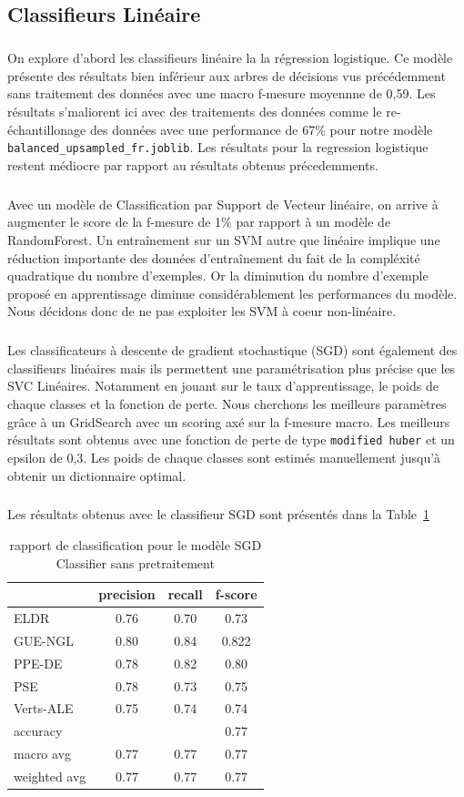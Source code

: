 \documentclass[11pt]{article}
\begin{document}
\subsection{Classifieurs Linéaire}
\subparagraph{}
On explore d'abord les classifieurs linéaire la la régression logistique. Ce modèle présente des résultats bien inférieur aux arbres de décisions vus précédemment sans traitement des données avec une macro f-mesure moyennne de 0,59. Les résultats s'maliorent ici avec des traitements des données comme le re-échantillonage des données avec une performance de 67\% pour notre modèle  \texttt{balanced\_upsampled\_fr.joblib}. Les résultats pour la regression logistique restent médiocre par rapport au résultats obtenus précedemments.
\subparagraph{}
Avec un modèle de Classification par Support de Vecteur linéaire, on arrive à augmenter le score de la f-mesure de 1\% par rapport à un modèle de RandomForest. Un entraînement sur un SVM autre que linéaire implique une réduction importante des données d'entraînement du fait de la compléxité quadratique du nombre d'exemples. Or la diminution du nombre d'exemple proposé en apprentissage diminue considérablement les performances du modèle. Nous décidons donc de ne pas exploiter les SVM à coeur non-linéaire.
\subparagraph{}
Les classificateurs à descente de gradient stochastique (SGD) sont également des classifieurs linéaires mais ils permettent une paramétrisation plus précise que les SVC Linéaires. Notamment en jouant sur le taux d'apprentissage, le poids de chaque classes et la fonction de perte. Nous cherchons les meilleurs paramètres grâce à un GridSearch avec un scoring axé sur la f-mesure macro.
Les meilleurs résultats sont obtenus avec une fonction de perte de type \texttt{modified huber} et un epsilon de 0,3. Les poids de chaque classes sont estimés manuellement jusqu'à obtenir un dictionnaire optimal.
\subparagraph{}
Les résultats obtenus avec le classifieur SGD sont présentés dans la Table~\ref{tab:SGD}

\begin{table}[h]
\centering
\begin{tabular}{lccc}
\hline
 & precision & recall & f-score\\
\hline
ELDR & 0.76 &  0.70& 0.73\\
GUE-NGL& 0.80 & 0.84 & 0.822\\
PPE-DE & 0.78 &  0.82  & 0.80 \\ 
PSE &  0.78 &  0.73 & 0.75\\ 
Verts-ALE &  0.75 & 0.74&  0.74\\
\hline
accuracy& & &    0.77 \\
macro avg &  0.77 &  0.77 &  0.77 \\
weighted avg &  0.77 & 0.77  &  0.77  \\
\hline
\end{tabular}
\caption{rapport de classification pour le modèle SGD Classifier sans pretraitement}
\label{tab:SGD}
\end{table}
\end{document}
